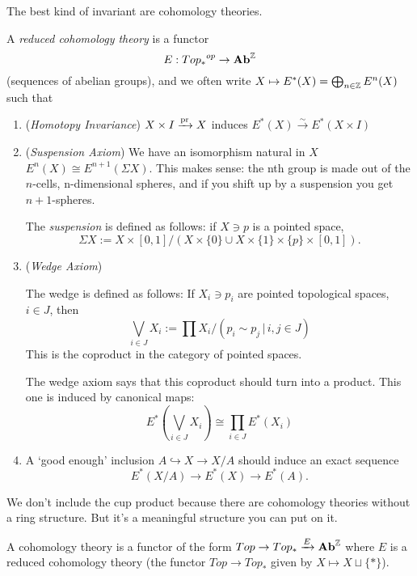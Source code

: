 \documentclass[class=report, crop=false,a4paper,twoside]{standalone}
\begin{document}
The best kind of invariant are cohomology theories.
\begin{definition}
	A \emph{reduced cohomology theory} is a functor 
	\[
	E: {Top_*}^{op} \to \mathbf{Ab}^{\mathbb{Z}}
	\]
	(sequences of abelian groups), and we often write $X \mapsto E^*(X) = \bigoplus_{n \in \mathbb{Z}} E^n(X)$ such that

	\begin{enumerate}
		\item (\emph{Homotopy Invariance}) $X \times I \xrightarrow{\operatorname{pr}} X$ induces $E^*(X) \xrightarrow{\sim} E^*(X \times I)$
		\item (\emph{Suspension Axiom}) We have an isomorphism natural in $X$ $E^n(X) \cong E^{n+1}(\Sigma X)$. This makes sense: the nth group is made out of the $n$-cells, n-dimensional spheres, and if you shift up by a suspension you get $n+1$-spheres.

		\begin{remark}
			The \emph{suspension} is defined as follows: if $X \ni p$ is a pointed space, 
			\[
			\Sigma X := X \times [0,1]/(X \times \{0\} \cup X \times \{1\} \times \{p\} \times [0,1]).
			\]
		\end{remark}

		\item (\emph{Wedge Axiom}) 

		\begin{remark}
			The wedge is defined as follows: If $X_i \ni p_i$ are pointed topological spaces, $i \in J$, then
			\[
			\bigvee_{i \in J}X_i := \prod X_i/(p_i \sim p_j \,|\, i,j \in J)
			\]
			This is the coproduct in the category of pointed spaces.
		\end{remark}

		The wedge axiom says that this coproduct should turn into a product. This one is induced by canonical maps:
		\[
		E^*(\bigvee_{i \in J} X_i )\cong \prod_{i \in J} E^*(X_i)
		\]

		\item A `good enough' inclusion $A \hookrightarrow X \to X/A$ should induce an exact sequence
		\[
		E^*(X/A) \to E^*(X) \to E^*(A).
		\]
	\end{enumerate}
\end{definition}

We don't include the cup product because there are cohomology theories without a ring structure. But it's a meaningful structure you can put on it. 

\begin{definition}
	A cohomology theory is a functor of the form $Top \to Top_* \xrightarrow{E} \mathbf{Ab}^{\mathbb{Z}}$ where $E$ is a reduced cohomology theory (the functor $Top \to Top_*$ given by $X \mapsto X \sqcup \{*\}$). 
\end{definition}
\end{document}
